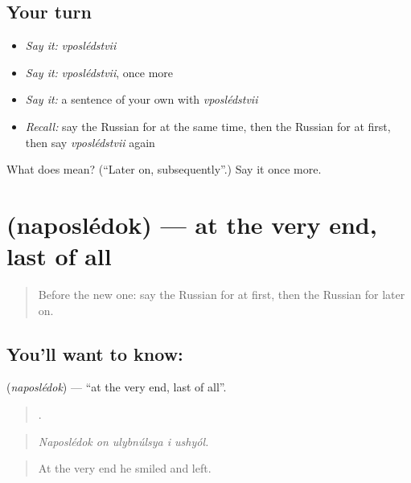 \subsection*{Your turn}
\begin{itemize}
\raggedright
  \item \emph{Say it:} \emph{vposlédstvii}
  \item \emph{Say it:} \emph{vposlédstvii}, once more
  \item \emph{Say it:} a sentence of your own with \emph{vposlédstvii}
  \item \emph{Recall:} say the Russian for at the same time, then the Russian for at first, then say \emph{vposlédstvii} again
\end{itemize}

\begin{tcolorbox}[breakable,colback=teal!4,colframe=teal!35!black,title={Before you move on}]
What does  mean? (\textquotedblleft{}Later on, subsequently\textquotedblright{}.) Say it once more.
\end{tcolorbox}
\section[\texorpdfstring{\ru{напоследок} (naposlédok)}{напоследок (naposlédok)}]{ (naposlédok) — at the very end, last of all}

\label{lesson:RU-C274-naposledok}



\begin{quote}
Before the new one: say the Russian for at first, then the Russian for later on.
\end{quote}

\subsection*{You'll want to know: }
\textbf{} (\emph{naposlédok}) — \textquotedblleft{}at the very end, last of all\textquotedblright{}.

\begin{quote}
    .
\end{quote}

\begin{quote}
\emph{Naposlédok on ulybnúlsya i ushyól.}
\end{quote}

\begin{quote}
At the very end he smiled and left.
\end{quote}

